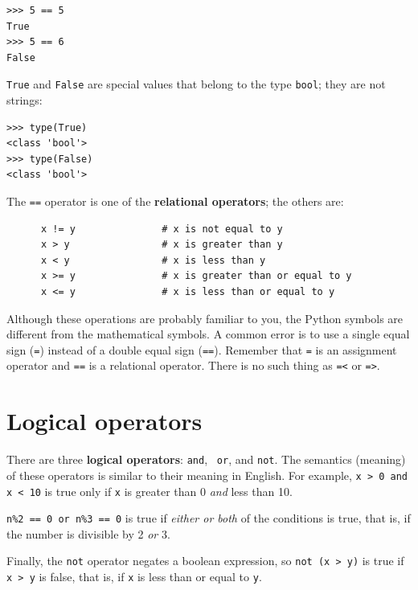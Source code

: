 \documentclass[10pt]{book}
\begin{document}
\begin{verbatim}
>>> 5 == 5
True
>>> 5 == 6
False
\end{verbatim}
%
{\tt True} and {\tt False} are special
values that belong to the type {\tt bool}; they are not strings:

\begin{verbatim}
>>> type(True)
<class 'bool'>
>>> type(False)
<class 'bool'>
\end{verbatim}
%
The {\tt ==} operator is one of the {\bf relational operators}; the
others are:

\begin{verbatim}
      x != y               # x is not equal to y
      x > y                # x is greater than y
      x < y                # x is less than y
      x >= y               # x is greater than or equal to y
      x <= y               # x is less than or equal to y
\end{verbatim}
%
Although these operations are probably familiar to you, the Python
symbols are different from the mathematical symbols.  A common error
is to use a single equal sign ({\tt =}) instead of a double equal sign
({\tt ==}).  Remember that {\tt =} is an assignment operator and
{\tt ==} is a relational operator.   There is no such thing as
{\tt =<} or {\tt =>}.


\section {Logical operators}

There are three {\bf logical operators}: {\tt and}, {\tt
or}, and {\tt not}.  The semantics (meaning) of these operators is
similar to their meaning in English.  For example,
{\tt x > 0 and x < 10} is true only if {\tt x} is greater than 0
{\em and} less than 10.

{\tt n\%2 == 0 or n\%3 == 0} is true if {\em either or both} of the
conditions is true, that is, if the number is divisible by 2 {\em or}
3.

Finally, the {\tt not} operator negates a boolean
expression, so {\tt not (x > y)} is true if {\tt x > y} is false,
that is, if {\tt x} is less than or equal to {\tt y}.
\end{document}
